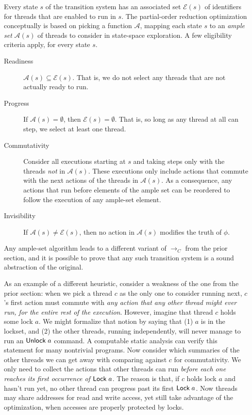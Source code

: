 \documentclass{amsbook}
\theoremstyle{definition}
\theoremstyle{remark}
\numberwithin{section}{chapter}
\numberwithin{equation}{chapter}
\begin{document}
Every state $s$ of the transition system has an associated set $\mathcal E(s)$ of identifiers for threads that are enabled to run in $s$.
The partial-order reduction optimization conceptually is based on picking a function $\mathcal A$, mapping each state $s$ to an \emph{ample set} $\mathcal A(s)$ of threads to consider in state-space exploration.
A few eligibility criteria apply, for every state $s$.

\begin{description}
  \item[Readiness] $\mathcal A(s) \subseteq \mathcal E(s)$.  That is, we do not select any threads that are not actually ready to run.
  \item[Progress] If $\mathcal A(s) = \emptyset$, then $\mathcal E(s) = \emptyset$.  That is, so long as any thread at all can step, we select at least one thread.
  \item[Commutativity] Consider all executions starting at $s$ and taking steps only with the threads \emph{not} in $\mathcal A(s)$.  These executions only include actions that commute with the next actions of the threads in $\mathcal A(s)$.  As a consequence, any actions that run before elements of the ample set can be reordered to follow the execution of any ample-set element.
  \item[Invisibility] If $\mathcal A(s) \neq \mathcal E(s)$, then no action in $\mathcal A(s)$ modifies the truth of $\phi$.
\end{description}

Any ample-set algorithm leads to a different variant of $\to_C$ from the prior section, and it is possible to prove that any such transition system is a sound abstraction of the original.

As an example of a different heuristic, consider a weakness of the one from the prior section: when we pick a thread $c$ as the only one to consider running next, $c$'s first action must commute with \emph{any action that any other thread might ever run, for the entire rest of the execution}.
However, imagine that thread $c$ holds some lock $a$.
We might formalize that notion by saying that (1) $a$ is in the lockset, and (2) the other threads, running independently, will never manage to run an $\mathsf{Unlock} \; a$ command.
A computable static analysis can verify this statement for many nontrivial programs.
Now consider which summaries of the other threads we can get away with comparing against $c$ for commutativity.
We only need to collect the actions that other threads can run \emph{before each one reaches its first occurrence of $\mathsf{Lock} \; a$}.
The reason is that, if $c$ holds lock $a$ and hasn't run yet, no other thread can progress past its first $\mathsf{Lock} \; a$.
Now threads may share addresses for read and write access, yet still take advantage of the optimization, when accesses are properly protected by locks.
\end{document}
